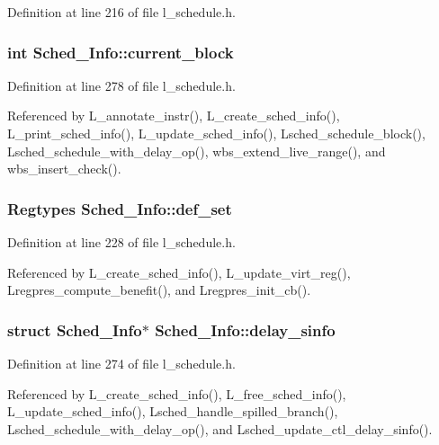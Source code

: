 Definition at line 216 of file l\_\-schedule.h.
\subsubsection{\setlength{\rightskip}{0pt plus 5cm}int \bf{Sched\_\-Info::current\_\-block}}\label{structSched__Info_ad5c63aafaa1ba037a56be2e10f8922c}




Definition at line 278 of file l\_\-schedule.h.

Referenced by L\_\-annotate\_\-instr(), L\_\-create\_\-sched\_\-info(), L\_\-print\_\-sched\_\-info(), L\_\-update\_\-sched\_\-info(), Lsched\_\-schedule\_\-block(), Lsched\_\-schedule\_\-with\_\-delay\_\-op(), wbs\_\-extend\_\-live\_\-range(), and wbs\_\-insert\_\-check().
\subsubsection{\setlength{\rightskip}{0pt plus 5cm}\bf{Regtypes} \bf{Sched\_\-Info::def\_\-set}}\label{structSched__Info_70f5b6b0c12b83bf73606f1df239c6d9}




Definition at line 228 of file l\_\-schedule.h.

Referenced by L\_\-create\_\-sched\_\-info(), L\_\-update\_\-virt\_\-reg(), Lregpres\_\-compute\_\-benefit(), and Lregpres\_\-init\_\-cb().
\subsubsection{\setlength{\rightskip}{0pt plus 5cm}struct \bf{Sched\_\-Info}$\ast$ \bf{Sched\_\-Info::delay\_\-sinfo}}\label{structSched__Info_e37fe1401cdfa750e6c8969cfc042db4}




Definition at line 274 of file l\_\-schedule.h.

Referenced by L\_\-create\_\-sched\_\-info(), L\_\-free\_\-sched\_\-info(), L\_\-update\_\-sched\_\-info(), Lsched\_\-handle\_\-spilled\_\-branch(), Lsched\_\-schedule\_\-with\_\-delay\_\-op(), and Lsched\_\-update\_\-ctl\_\-delay\_\-sinfo().
